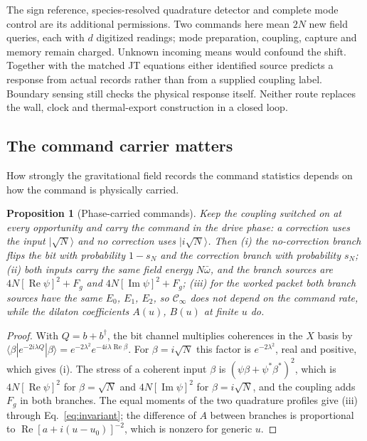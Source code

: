 \documentclass[12pt,a4paper]{article}
\newtheorem{proposition}[theorem]{Proposition}
\begin{document}
The sign reference, species-resolved quadrature detector and complete mode
control are its additional permissions. Two commands here mean $2N$ new field
queries, each with $d$ digitized readings; mode preparation, coupling, capture
and memory remain charged. Unknown incoming means would confound the shift.
Together with the matched JT equations either identified source predicts a
response from actual records rather than from a supplied coupling label.
Boundary sensing still checks the physical response itself. Neither route
replaces the wall, clock and thermal-export construction in a closed loop.


\subsection{The command carrier matters}

How strongly the gravitational field records the command statistics depends on how the command is physically carried.

\begin{proposition}[Phase-carried commands]
\label{prop:carrier}
Keep the coupling switched on at every opportunity and carry the command in the drive phase: a correction uses the input $|\sqrt N\rangle$ and no correction uses $|i\sqrt N\rangle$. Then (i) the no-correction branch flips the bit with probability $1-s_N$ and the correction branch with probability $s_N$; (ii) both inputs carry the same field energy $N\bar\omega$, and the branch sources are $4N[\operatorname{Re}\psi]^2+F_g$ and $4N[\operatorname{Im}\psi]^2+F_g$; (iii) for the worked packet both branch sources have the same $E_0$, $E_1$, $E_2$, so $\mathcal C_\infty$ does not depend on the command rate, while the dilaton coefficients $A(u)$, $B(u)$ at finite $u$ do.
\end{proposition}

\begin{proof}
With $Q=b+b^\dagger$, the bit channel multiplies coherences in the $X$ basis by $\langle\beta|e^{-2i\lambda Q}|\beta\rangle=e^{-2\lambda^2}e^{-4i\lambda\operatorname{Re}\beta}$. For $\beta=i\sqrt N$ this factor is $e^{-2\lambda^2}$, real and positive, which gives (i). The stress of a coherent input $\beta$ is $(\psi\beta+\psi^*\beta^*)^2$, which is $4N[\operatorname{Re}\psi]^2$ for $\beta=\sqrt N$ and $4N[\operatorname{Im}\psi]^2$ for $\beta=i\sqrt N$, and the coupling adds $F_g$ in both branches. The equal moments of the two quadrature profiles give (iii) through Eq.~\eqref{eq:invariant}; the difference of $A$ between branches is proportional to $\operatorname{Re}[a+i(u-u_0)]^{-2}$, which is nonzero for generic $u$.
\end{proof}
\end{document}
